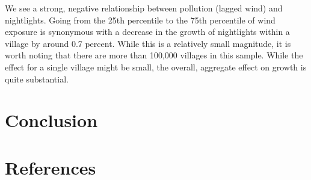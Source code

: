 \documentclass[
]{article}
\begin{document}
We see a strong, negative relationship between pollution (lagged wind) and nightlights. Going from the 25th percentile to the 75th percentile of wind exposure is synonymous with a decrease in the growth of nightlights within a village by around 0.7 percent. While this is a relatively small magnitude, it is worth noting that there are more than 100,000 villages in this sample. While the effect for a single village might be small, the overall, aggregate effect on growth is quite substantial.

\hypertarget{conclusion}{%
\section{Conclusion}\label{conclusion}}

\FloatBarrier
\newpage
\singlespacing

\hypertarget{references}{%
\section*{References}\label{references}}
\end{document}

